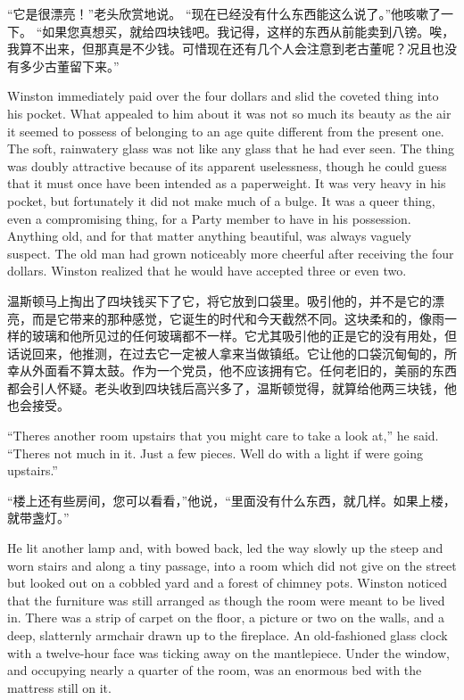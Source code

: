 \begin{paracol}{2}
\switchcolumn

``它是很漂亮！''老头欣赏地说。
``现在已经没有什么东西能这么说了。''他咳嗽了一下。
``如果您真想买，就给四块钱吧。我记得，这样的东西从前能卖到八镑。唉，我算不出来，但那真是不少钱。可惜现在还有几个人会注意到老古董呢？况且也没有多少古董留下来。''

\switchcolumn*

Winston immediately paid over the four dollars and slid the coveted
thing into his pocket. What appealed to him about it was not so much its
beauty as the air it seemed to possess of belonging to an age quite
different from the present one. The soft, rainwatery glass was not like
any glass that he had ever seen. The thing was doubly attractive because
of its apparent uselessness, though he could guess that it must once
have been intended as a paperweight. It was very heavy in his pocket,
but fortunately it did not make much of a bulge. It was a queer thing,
even a compromising thing, for a Party member to have in his possession.
Anything old, and for that matter anything beautiful, was always vaguely
suspect. The old man had grown noticeably more cheerful after receiving
the four dollars. Winston realized that he would have accepted three or
even two.

\switchcolumn

温斯顿马上掏出了四块钱买下了它，将它放到口袋里。吸引他的，并不是它的漂亮，而是它带来的那种感觉，它诞生的时代和今天截然不同。这块柔和的，像雨一样的玻璃和他所见过的任何玻璃都不一样。它尤其吸引他的正是它的没有用处，但话说回来，他推测，在过去它一定被人拿来当做镇纸。它让他的口袋沉甸甸的，所幸从外面看不算太鼓。作为一个党员，他不应该拥有它。任何老旧的，美丽的东西都会引人怀疑。老头收到四块钱后高兴多了，温斯顿觉得，就算给他两三块钱，他也会接受。

\switchcolumn*

``There\textquotesingle s another room upstairs that you might care to
take a look at,'' he said. ``There\textquotesingle s not much in it. Just
a few pieces. We\textquotesingle ll do with a light if
we\textquotesingle re going upstairs.''

\switchcolumn

``楼上还有些房间，您可以看看，''他说，``里面没有什么东西，就几样。如果上楼，
就带盏灯。''

\switchcolumn*

He lit another lamp and, with bowed back, led the way slowly up the
steep and worn stairs and along a tiny passage, into a room which did
not give on the street but looked out on a cobbled yard and a forest of
chimney pots. Winston noticed that the furniture was still arranged as
though the room were meant to be lived in. There was a strip of carpet
on the floor, a picture or two on the walls, and a deep, slatternly
armchair drawn up to the fireplace. An old-fashioned glass clock with a
twelve-hour face was ticking away on the mantlepiece. Under the window,
and occupying nearly a quarter of the room, was an enormous bed with the
mattress still on it.


\end{paracol}
